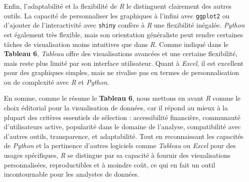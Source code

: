 \documentclass[
  letterpaper,
  DIV=11,
  numbers=noendperiod]{scrreprt}
\begin{document}
Enfin, l'adaptabilité et la flexibilité de \emph{R} le distinguent
clairement des autres outils. La capacité de personnaliser les
graphiques à l'infini avec \texttt{ggplot2} ou d'ajouter de
l'interactivité avec \texttt{shiny} confère à \emph{R} une flexibilité
inégalée. \emph{Python} est également très flexible, mais son
orientation généraliste peut rendre certaines tâches de visualisation
moins intuitives que dans \emph{R}. Comme indiqué dans le
\textbf{Tableau 6}, \emph{Tableau} offre des visualisations avancées et
une certaine flexibilité, mais reste plus limité par son interface
utilisateur. Quant à \emph{Excel}, il est excellent pour des graphiques
simples, mais ne rivalise pas en termes de personnalisation ou de
complexité avec \emph{R} et \emph{Python}.

En somme, comme le résume le \textbf{Tableau 6}, nous mettons en avant
\emph{R} comme le choix éditorial pour la visualisation de données, car
il répond au mieux à la plupart des critères essentiels de sélection :
accessibilité financière, communauté d'utilisateurs active, popularité
dans le domaine de l'analyse, compatibilité avec d'autres outils,
transparence, et adaptabilité. Tout en reconnaissant les capacités de
\emph{Python} et la pertinence d'autres logiciels comme \emph{Tableau}
ou \emph{Excel} pour des usages spécifiques, \emph{R} se distingue par
sa capacité à fournir des visualisations personnalisées, reproductibles
et à moindre coût, ce qui en fait un outil incontournable pour les
analystes de données.
\end{document}
